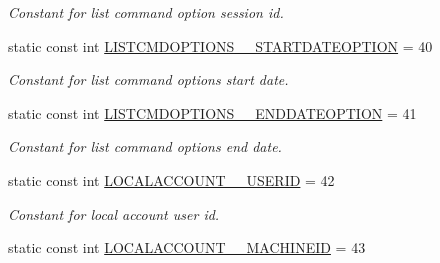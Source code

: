 \begin{DoxyCompactItemize}
\begin{DoxyCompactList}\small\item\em Constant for list command option session id. \item\end{DoxyCompactList}\item 
\hypertarget{classUMS__Data_1_1UMS__DataPackage_a93dbc3bbb73a493edb928d8b7c93d8a5}{
static const int \hyperlink{classUMS__Data_1_1UMS__DataPackage_a93dbc3bbb73a493edb928d8b7c93d8a5}{LISTCMDOPTIONS\_\-\_\-STARTDATEOPTION} = 40}
\label{classUMS__Data_1_1UMS__DataPackage_a93dbc3bbb73a493edb928d8b7c93d8a5}

\begin{DoxyCompactList}\small\item\em Constant for list command options start date. \item\end{DoxyCompactList}\item 
\hypertarget{classUMS__Data_1_1UMS__DataPackage_acf61d7553b36dbac13915d62862fc92d}{
static const int \hyperlink{classUMS__Data_1_1UMS__DataPackage_acf61d7553b36dbac13915d62862fc92d}{LISTCMDOPTIONS\_\-\_\-ENDDATEOPTION} = 41}
\label{classUMS__Data_1_1UMS__DataPackage_acf61d7553b36dbac13915d62862fc92d}

\begin{DoxyCompactList}\small\item\em Constant for list command options end date. \item\end{DoxyCompactList}\item 
\hypertarget{classUMS__Data_1_1UMS__DataPackage_a2d2f64a65697e2dc296ad39b8f9080b2}{
static const int \hyperlink{classUMS__Data_1_1UMS__DataPackage_a2d2f64a65697e2dc296ad39b8f9080b2}{LOCALACCOUNT\_\-\_\-USERID} = 42}
\label{classUMS__Data_1_1UMS__DataPackage_a2d2f64a65697e2dc296ad39b8f9080b2}

\begin{DoxyCompactList}\small\item\em Constant for local account user id. \item\end{DoxyCompactList}\item 
\hypertarget{classUMS__Data_1_1UMS__DataPackage_a3bc3f1e7cfebdb165d565cede5b6b65f}{
static const int \hyperlink{classUMS__Data_1_1UMS__DataPackage_a3bc3f1e7cfebdb165d565cede5b6b65f}{LOCALACCOUNT\_\-\_\-MACHINEID} = 43}
\label{classUMS__Data_1_1UMS__DataPackage_a3bc3f1e7cfebdb165d565cede5b6b65f}


\end{DoxyCompactItemize}
